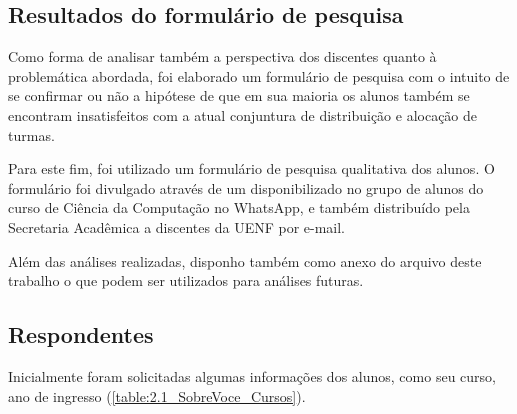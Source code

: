\begin{apendicesenv} %

  \chapter{Resultados do formulário de pesquisa} \label{chap:Formulário de pesquisa}

  Como forma de analisar também a perspectiva dos discentes quanto à problemática abordada, foi elaborado um formulário de pesquisa com o intuito de se confirmar ou não a hipótese de que em sua maioria os alunos também se encontram insatisfeitos com a atual conjuntura de distribuição e alocação de turmas.

  Para este fim, foi utilizado um formulário de pesquisa qualitativa dos alunos. O formulário foi divulgado através de um  disponibilizado no grupo de alunos do curso de Ciência da Computação no WhatsApp, e também distribuído pela Secretaria Acadêmica a discentes da UENF por e-mail.

  Além das análises realizadas, disponho também como anexo do arquivo deste trabalho o
  que podem ser utilizados para análises futuras.


  \section*{Respondentes} \label{sec:Respondentes}

  Inicialmente foram solicitadas algumas informações dos alunos, como seu curso, ano de ingresso (\autoref{table:2.1_SobreVoce_Cursos}).


\end{apendicesenv}
